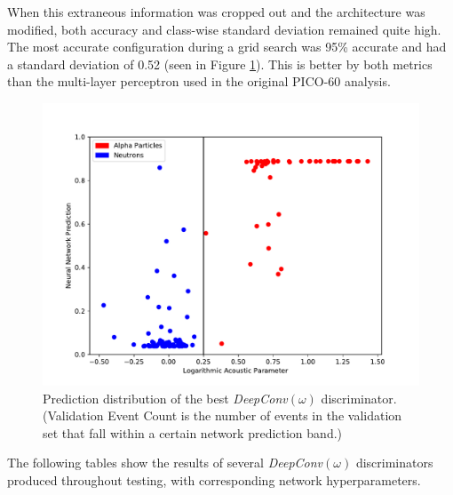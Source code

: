 \documentclass[10pt]{article}
\begin{document}
When this extraneous information was cropped out and the architecture was modified, both accuracy and class-wise standard deviation remained quite high. The most accurate configuration during a grid search was 95\% accurate and had a standard deviation of 0.52 (seen in Figure \ref{waveform_hist}). This is better by both metrics than the multi-layer perceptron used in the original PICO-60 analysis.

\begin{figure}[h]
    \centering
    \includegraphics[width=\textwidth]{waveform_hist}
    \caption{\label{waveform_hist} Prediction distribution of the best {\it DeepConv}$(\omega)$ discriminator. (Validation Event Count is the number of events in the validation set that fall within a certain network prediction band.)}
\end{figure}

The following tables show the results of several {\it DeepConv}$(\omega)$ discriminators produced throughout testing, with corresponding network hyperparameters.
\end{document}
